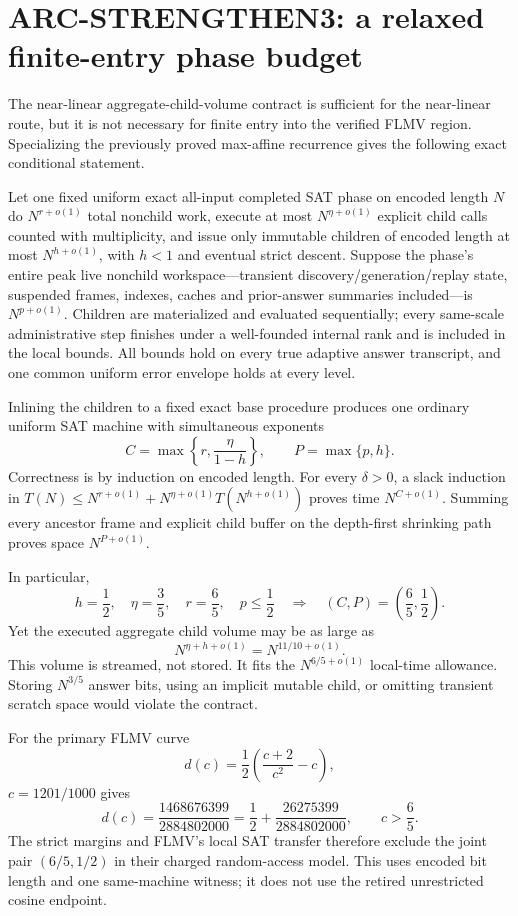 \section*{ARC-STRENGTHEN3: a relaxed finite-entry phase budget}

The near-linear aggregate-child-volume contract is sufficient for the
near-linear route, but it is not necessary for finite entry into the verified
FLMV region.  Specializing the previously proved max-affine recurrence gives
the following exact conditional statement.

Let one fixed uniform exact all-input completed SAT phase on encoded length
$N$ do $N^{r+o(1)}$ total nonchild work, execute at most
$N^{\eta+o(1)}$ explicit child calls counted with multiplicity, and issue only
immutable children of encoded length at most $N^{h+o(1)}$, with $h<1$ and
eventual strict descent.  Suppose the phase's entire peak live nonchild
workspace---transient discovery/generation/replay state, suspended frames,
indexes, caches and prior-answer summaries included---is $N^{p+o(1)}$.
Children are materialized and evaluated sequentially; every same-scale
administrative step finishes under a well-founded internal rank and is
included in the local bounds.  All bounds hold on every true adaptive answer
transcript, and one common uniform error envelope holds at every level.

Inlining the children to a fixed exact base procedure produces one ordinary
uniform SAT machine with simultaneous exponents
\[
 C=\max\left\{r,\frac{\eta}{1-h}\right\},
 \qquad P=\max\{p,h\}.
\]
Correctness is by induction on encoded length.  For every $\delta>0$, a
slack induction in
$T(N)\le N^{r+o(1)}+N^{\eta+o(1)}T(N^{h+o(1)})$
proves time $N^{C+o(1)}$.  Summing every ancestor frame and explicit child
buffer on the depth-first shrinking path proves space $N^{P+o(1)}$.

In particular,
\[
 h=\frac12,\quad\eta=\frac35,\quad r=\frac65,
 \quad p\le\frac12
 \quad\Longrightarrow\quad (C,P)=\left(\frac65,\frac12\right).
\]
Yet the executed aggregate child volume may be as large as
\[
 N^{\eta+h+o(1)}=N^{11/10+o(1)}.
\]
This volume is streamed, not stored.  It fits the $N^{6/5+o(1)}$ local-time
allowance.  Storing $N^{3/5}$ answer bits, using an implicit mutable child,
or omitting transient scratch space would violate the contract.

For the primary FLMV curve
\[
 d(c)=\frac12\left(\frac{c+2}{c^2}-c\right),
\]
$c=1201/1000$ gives
\[
 d(c)=\frac{1468676399}{2884802000}
 =\frac12+\frac{26275399}{2884802000},
 \qquad c>\frac65.
\]
The strict margins and FLMV's local SAT transfer therefore exclude the joint
pair $(6/5,1/2)$ in their charged random-access model.  This uses encoded bit
length and one same-machine witness; it does not use the retired unrestricted
cosine endpoint.

